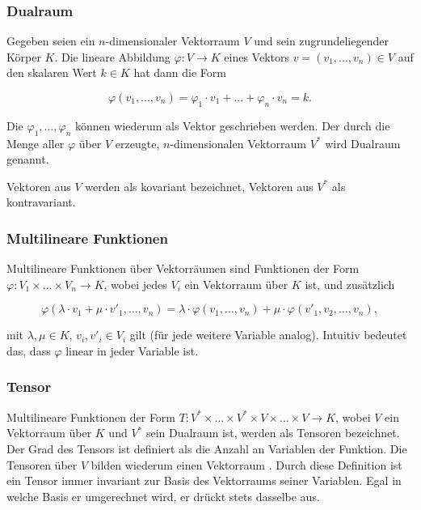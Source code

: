 \documentclass[a4paper,fontsize=12pt,toc=bib,parskip=half,ngerman]{scrartcl}
\begin{document}
\subsubsection{Dualraum}
Gegeben seien ein $n$-dimensionaler Vektorraum  $V$ und sein zugrundeliegender K\"orper $K$. Die lineare Abbildung $\varphi: V \rightarrow K$ eines Vektors $v = (v_1, ..., v_n) \in V$ auf den skalaren Wert $k \in K$ hat dann die Form

\begin{equation}
	\varphi(v_1, ..., v_n) = \varphi_1 \cdot v_1 + ... + \varphi_n \cdot v_n = k.
\end{equation}

Die $\varphi_1, ..., \varphi_n$ k\"onnen wiederum als Vektor geschrieben werden. Der durch die Menge aller $\varphi$ \"uber $V$  erzeugte, $n$-dimensionalen Vektorraum $V^*$ wird Dualraum genannt\cite[S.~203]{bowen2008introduction}.

Vektoren aus $V$ werden als kovariant bezeichnet, Vektoren aus $V^*$ als kontravariant\cite[S.~205]{bowen2008introduction}.

\subsubsection{Multilineare Funktionen}
Multilineare Funktionen \"uber Vektorr\"aumen sind Funktionen der Form $\varphi: V_1 \times \dots \times V_n \rightarrow K$, wobei jedes $V_i$ ein Vektorraum \"uber $K$ ist, und zus\"atzlich 

\begin{equation}
	\varphi(\lambda \cdot v_1 + \mu \cdot v'_1, \dots, v_n) = \lambda \cdot \varphi(v_1, \dots, v_n) + \mu \cdot \varphi(v'_1, v_2, \dots, v_n),
\end{equation}

mit $\lambda, \mu \in K$, $v_i, v'_i \in V_i$ gilt (f\"ur jede weitere Variable analog). Intuitiv bedeutet das, dass $\varphi$ linear in jeder Variable ist\cite[S.~204, 218]{bowen2008introduction}.





\subsubsection{Tensor}
Multilineare Funktionen der Form $T: V^*\times\dots\times V^*\times V \times \dots \times V \rightarrow K$, wobei $V$ ein Vektorraum \"uber $K$ und $V^*$ sein Dualraum ist, werden als Tensoren bezeichnet\cite[S.~218]{bowen2008introduction}. Der Grad des Tensors ist definiert als die Anzahl an Variablen der Funktion. Die Tensoren \"uber $V$ bilden wiederum einen Vektorraum \cite[S.~220]{bowen2008introduction}. Durch diese Definition ist ein Tensor immer invariant zur Basis des Vektorraums seiner Variablen. Egal in welche Basis er umgerechnet wird, er dr\"uckt stets dasselbe aus.
\end{document}
